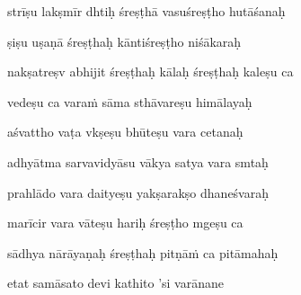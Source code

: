 strīṣu lakṣmīr dhtiḥ śreṣṭhā vasuśreṣṭho hutāśanaḥ \veg\dontdisplaylinenum
            \var{\vcd \om\ \Ed}%

ṣiṣu uṣaṇā śreṣṭhaḥ kāntiśreṣṭho niśākaraḥ\thinspace{\dandab} \dontdisplaylinenum

nakṣatreṣv abhijit śreṣṭhaḥ kālaḥ śreṣṭhaḥ kaleṣu ca  \veg\dontdisplaylinenum

vedeṣu ca vara\.m sāma sthāvareṣu himālayaḥ\thinspace{\dandab} \dontdisplaylinenum

aśvattho vaṭa vkṣeṣu bhūteṣu vara cetanaḥ \veg\dontdisplaylinenum

adhyātma sarvavidyāsu vākya satya vara smtaḥ\thinspace{\dandab} \dontdisplaylinenum

prahlādo vara daityeṣu yakṣarakṣo dhaneśvaraḥ \veg\dontdisplaylinenum

marīcir vara vāteṣu hariḥ śreṣṭho mgeṣu ca\thinspace{\dandab} \dontdisplaylinenum

sādhya nārāyaṇaḥ śreṣṭhaḥ pitṇā\.m ca pitāmahaḥ \veg\dontdisplaylinenum

etat samāsato devi kathito 'si varānane\thinspace{\dandab} \dontdisplaylinenum

